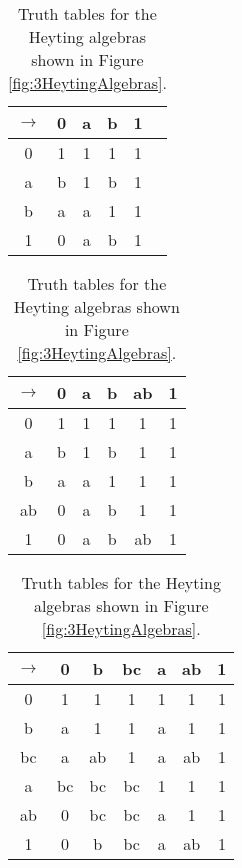 \begin{table}[h]
\centering
\begin{tabular}{c|ccccc}
$\to$	& 0 & a & b & 1 \\
\hline
0	&	1 & 1 & 1 & 1	\\
a	&	b & 1 & b & 1 	\\
b	&	a & a & 1 & 1 	\\
1	&	0 & a & b & 1 	
\end{tabular}
%
\quad
%
\begin{tabular}{c|ccccc}
$\to$	 & 0 & a & b & ab & 1\\
\hline
0	&	 1 & 1 & 1 & 1 & 1	\\
a	&	 b & 1 & b & 1 & 1	\\
b	&	 a & a & 1 & 1 & 1	\\
ab	&	 0 & a & b & 1 & 1	\\
1	&	 0 & a & b & ab & 1	\\
\end{tabular}
%
\quad
%
\begin{tabular}{c|ccc|ccc}
$\to$	& 0 & b & bc & a & ab & 1\\
\hline
0	&	1 & 1 & 1 & 1 & 1 & 1 	\\
b	&	a & 1 & 1 & a & 1 & 1 	\\
bc	&	a & ab & 1 & a & ab & 1 	\\
\hline
a	&	bc & bc & bc & 1 & 1 & 1 	\\
ab	&	0 & bc & bc & a & 1 & 1 	\\
1	&	0 & b & bc & a & ab & 1 	\\
\end{tabular}
\caption{Truth tables for the Heyting algebras shown in Figure \ref{fig:3HeytingAlgebras}.}\label{tab:3HeytingAlgebras}
\end{table}


